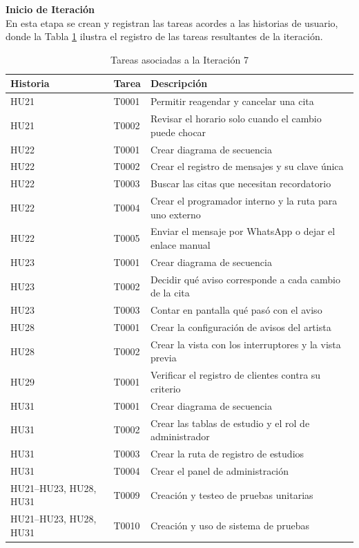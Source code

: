 \documentclass[12pt,letterpaper,oneside]{report}
\newcommand{\tituloparpegado}[1]{\par\textbf{#1}\\\indent\ignorespaces}
\begin{document}
\vspace{0.3cm}
\tituloparpegado{Inicio de Iteración}
En esta etapa se crean y registran las tareas acordes a las historias de usuario, donde la Tabla \ref{tab:tareas7} ilustra el registro de las tareas resultantes de la iteración.

\begin{table}[H]
  \centering
  \caption{Tareas asociadas a la Iteración 7}
  \label{tab:tareas7}
  \renewcommand{\arraystretch}{1.2}
  \begin{tabular}{|l|l|p{7.2cm}|}
    \hline
    \textbf{Historia} & \textbf{Tarea} & \textbf{Descripción} \\
    \hline
    HU21 & T0001 & Permitir reagendar y cancelar una cita \\ \hline
    HU21 & T0002 & Revisar el horario solo cuando el cambio puede chocar \\ \hline
    HU22 & T0001 & Crear diagrama de secuencia \\ \hline
    HU22 & T0002 & Crear el registro de mensajes y su clave única \\ \hline
    HU22 & T0003 & Buscar las citas que necesitan recordatorio \\ \hline
    HU22 & T0004 & Crear el programador interno y la ruta para uno externo \\ \hline
    HU22 & T0005 & Enviar el mensaje por WhatsApp o dejar el enlace manual \\ \hline
    HU23 & T0001 & Crear diagrama de secuencia \\ \hline
    HU23 & T0002 & Decidir qué aviso corresponde a cada cambio de la cita \\ \hline
    HU23 & T0003 & Contar en pantalla qué pasó con el aviso \\ \hline
    HU28 & T0001 & Crear la configuración de avisos del artista \\ \hline
    HU28 & T0002 & Crear la vista con los interruptores y la vista previa \\ \hline
    HU29 & T0001 & Verificar el registro de clientes contra su criterio \\ \hline
    HU31 & T0001 & Crear diagrama de secuencia \\ \hline
    HU31 & T0002 & Crear las tablas de estudio y el rol de administrador \\ \hline
    HU31 & T0003 & Crear la ruta de registro de estudios \\ \hline
    HU31 & T0004 & Crear el panel de administración \\ \hline
    HU21--HU23, HU28, HU31 & T0009 & Creación y testeo de pruebas unitarias \\ \hline
    HU21--HU23, HU28, HU31 & T0010 & Creación y uso de sistema de pruebas \\ \hline
  \end{tabular}
\end{table}
\end{document}

